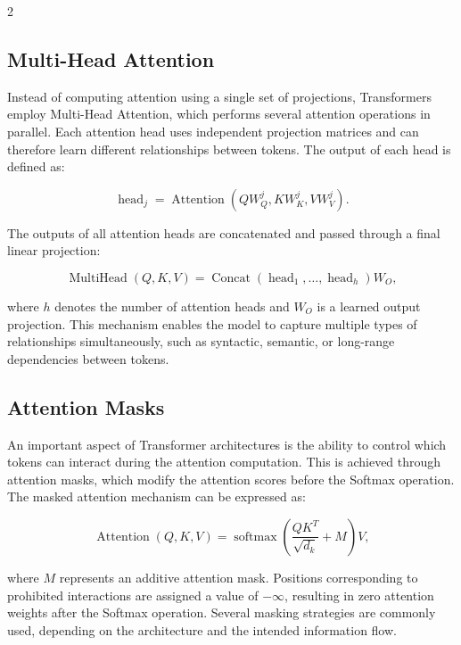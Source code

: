 \documentclass[10pt]{article}
\begin{document}
\begin{multicols}{2}
\subsection{Multi-Head Attention}
Instead of computing attention using a single set of projections, 
Transformers employ Multi-Head Attention, which performs several attention operations in parallel. 
Each attention head uses independent projection matrices and can therefore learn different relationships between tokens.
The output of each head is defined as:

\begin{equation}
\operatorname{head}_j =
\operatorname{Attention}
\left(
QW_Q^j,KW_K^j,VW_V^j
\right).
\end{equation}

The outputs of all attention heads are concatenated and passed through a final linear projection:

\begin{equation}
\operatorname{MultiHead}(Q,K,V)
=
\operatorname{Concat}
(\operatorname{head}_1,\ldots,\operatorname{head}_h)W_O,
\end{equation}

where \(h\) denotes the number of attention heads and \(W_O\) is a learned output projection.
This mechanism enables the model to capture multiple types of relationships simultaneously, 
such as syntactic, semantic, or long-range dependencies between tokens.

\subsection{Attention Masks}
An important aspect of Transformer architectures is the ability to control which tokens can interact during the attention computation. 
This is achieved through attention masks, which modify the attention scores before the Softmax operation.
The masked attention mechanism can be expressed as:

\begin{equation}
\operatorname{Attention}(Q,K,V)
=
\operatorname{softmax}
\left(
\frac{QK^T}{\sqrt{d_k}}+M
\right)V,
\end{equation}

where \(M\) represents an additive attention mask. 
Positions corresponding to prohibited interactions are assigned a value of \(-\infty\), 
resulting in zero attention weights after the Softmax operation.
Several masking strategies are commonly used, depending on the architecture and the intended information flow.


\end{multicols}
\end{document}
